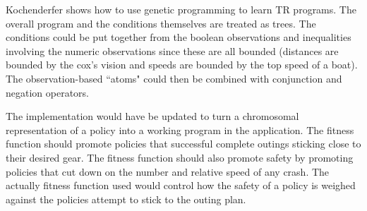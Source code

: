Kochenderfer shows how to use genetic programming to learn TR programs. The overall program and the conditions themselves are treated as trees. The conditions could be put together from the boolean observations and inequalities involving the numeric observations since these are all bounded (distances are bounded by the cox's vision and speeds are bounded by the top speed of a boat). The observation-based ``atoms" could then be combined with conjunction and negation operators. 

The implementation would have be updated to turn a chromosomal representation of a policy into a working program in the application. The fitness function should promote policies that successful complete outings sticking close to their desired gear. The fitness function should also promote safety by promoting policies that cut down on the number and relative speed of any crash. The actually fitness function used would control how the safety of a policy is weighed against the policies attempt to stick to the outing plan.

